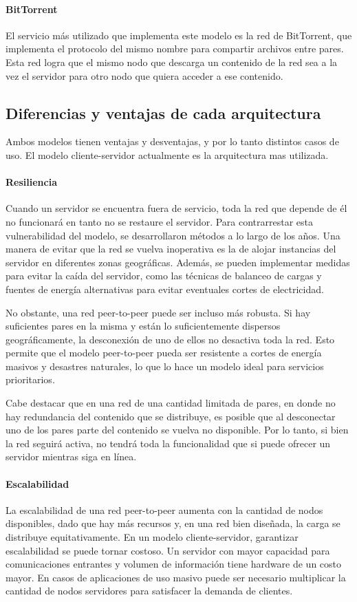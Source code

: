 \paragraph{BitTorrent} El servicio más utilizado que implementa este modelo es la red de BitTorrent, que implementa el protocolo del mismo nombre para compartir archivos entre pares. Esta red logra que el mismo nodo que descarga un contenido de la red sea a la vez el servidor para otro nodo que quiera acceder a ese contenido. 

\subsection{Diferencias y ventajas de cada arquitectura}
Ambos modelos tienen ventajas y desventajas, y por lo tanto distintos casos de uso. El modelo cliente-servidor actualmente es la arquitectura mas utilizada.

\paragraph{Resiliencia}
Cuando un servidor se encuentra fuera de servicio, toda la red que depende de él no funcionará en tanto no se restaure el servidor. Para contrarrestar esta vulnerabilidad del modelo, se desarrollaron métodos a lo largo de los años. Una manera de evitar que la red se vuelva inoperativa es la de alojar instancias del servidor en diferentes zonas geográficas. Además, se pueden implementar medidas para evitar la caída del servidor, como las técnicas de balanceo de cargas y fuentes de energía alternativas para evitar eventuales cortes de electricidad.

No obstante, una red peer-to-peer puede ser incluso más robusta. Si hay suficientes pares en la misma y están lo suficientemente dispersos geográficamente, la desconexión de uno de ellos no desactiva toda la red. Esto permite que el modelo peer-to-peer pueda ser resistente a cortes de energía masivos y desastres naturales, lo que lo hace un modelo ideal para servicios prioritarios.

Cabe destacar que en una red de una cantidad limitada de pares, en donde no hay redundancia del contenido que se distribuye, es posible que al desconectar uno de los pares parte del contenido se vuelva no disponible. Por lo tanto, si bien la red seguirá activa, no tendrá toda la funcionalidad que si puede ofrecer un servidor mientras siga en línea.

\paragraph{Escalabilidad}
La escalabilidad de una red peer-to-peer aumenta con la cantidad de nodos disponibles, dado que hay más recursos y, en una red bien diseñada, la carga se distribuye equitativamente. En un modelo cliente-servidor, garantizar escalabilidad se puede tornar costoso. Un servidor con mayor capacidad para comunicaciones entrantes y volumen de información tiene hardware de un costo mayor. En casos de aplicaciones de uso masivo puede ser necesario multiplicar la cantidad de nodos servidores para satisfacer la demanda de clientes.

